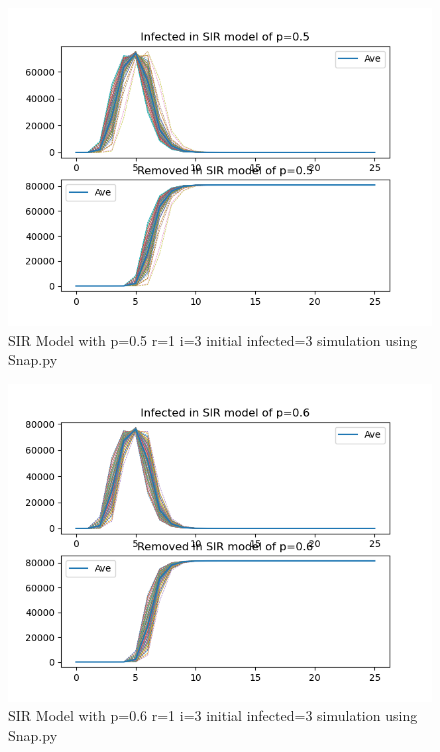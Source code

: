 \documentclass{subfile}
\begin{document}
  \begin{figure}
  \includegraphics[scale=0.8]{sirp05r1i3s3}
  \caption[SIR p=0.5,r=1,i=3,init infected=3]{SIR Model with p=0.5 r=1 i=3 initial infected=3 simulation using Snap.py}
  \end{figure}
  \begin{figure}
  \includegraphics[scale=0.8]{sirp06r1i3s3}
  \caption[SIR p=0.6,r=1,i=3,init infected=3]{SIR Model with p=0.6 r=1 i=3 initial infected=3 simulation using Snap.py}
  \end{figure}
\end{document}
